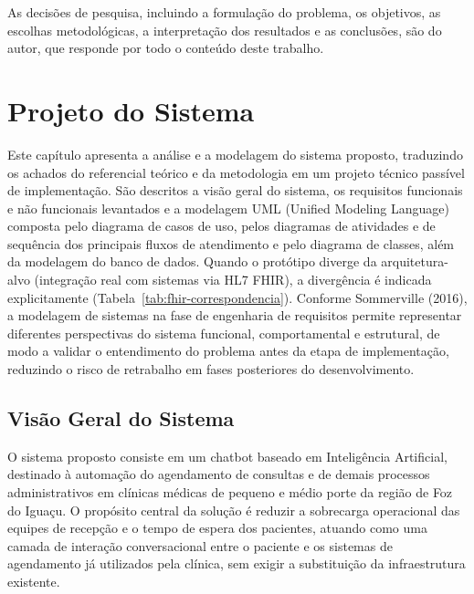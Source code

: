 \documentclass[12pt,a4paper]{extarticle}
\begin{document}
As decisões de pesquisa, incluindo a formulação do problema, os objetivos, as escolhas metodológicas, a interpretação dos resultados e as conclusões, são do autor, que responde por todo o conteúdo deste trabalho.



\newpage
\section{Projeto do Sistema}
\label{cap:projeto}

Este capítulo apresenta a análise e a modelagem do sistema proposto, traduzindo os achados do referencial teórico e da metodologia em um projeto técnico passível de implementação. São descritos a visão geral do sistema, os requisitos funcionais e não funcionais levantados e a modelagem UML (Unified Modeling Language) composta pelo diagrama de casos de uso, pelos diagramas de atividades e de sequência dos principais fluxos de atendimento e pelo diagrama de classes, além da modelagem do banco de dados. Quando o protótipo diverge da arquitetura-alvo (integração real com sistemas via HL7 FHIR), a divergência é indicada explicitamente (Tabela~\ref{tab:fhir-correspondencia}). Conforme Sommerville (2016), a modelagem de sistemas na fase de engenharia de requisitos permite representar diferentes perspectivas do sistema funcional, comportamental e estrutural, de modo a validar o entendimento do problema antes da etapa de implementação, reduzindo o risco de retrabalho em fases posteriores do desenvolvimento.

\subsection{Visão Geral do Sistema}
\label{sec:visao-geral}

O sistema proposto consiste em um chatbot baseado em Inteligência Artificial, destinado à automação do agendamento de consultas e de demais processos administrativos em clínicas médicas de pequeno e médio porte da região de Foz do Iguaçu. O propósito central da solução é reduzir a sobrecarga operacional das equipes de recepção e o tempo de espera dos pacientes, atuando como uma camada de interação conversacional entre o paciente e os sistemas de agendamento já utilizados pela clínica, sem exigir a substituição da infraestrutura existente.
\end{document}
